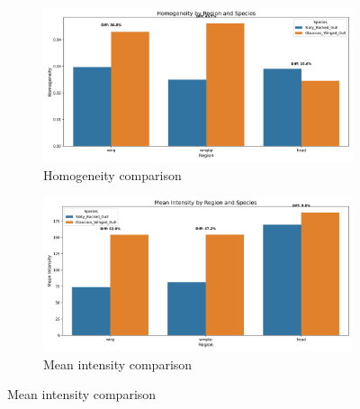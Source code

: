 \documentclass[a4paper,12pt]{report}
\begin{document}
\begin{figure}[H]
    \begin{subfigure}[t]{0.48\textwidth}
        \centering
        \includegraphics[width=\textwidth]{images/appendix/Original/homogeneity_comparison.png}
        \caption{Homogeneity comparison}
    \end{subfigure}
    \hfill
    \begin{subfigure}[t]{0.48\textwidth}
        \centering
        \includegraphics[width=\textwidth]{images/appendix/Original/mean_intensity_comparison.png}
        \caption{Mean intensity comparison}
    \end{subfigure}
    
    \vspace{0.5cm}
    

\end{figure}
\end{document}
